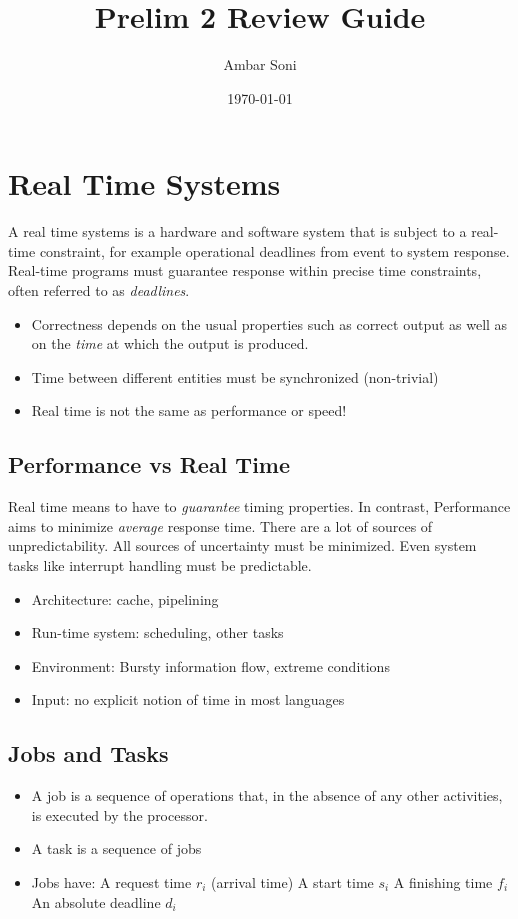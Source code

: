 \documentclass{hw}
\title{Prelim 2 Review Guide}     %
\author{Ambar Soni}               %
\date{\today}                     %
\begin{document}
\maketitle
\tableofcontents

\section{Real Time Systems}
A real time systems is a hardware and software system that is subject to a 
real-time constraint, for example operational deadlines from event to system 
response. Real-time programs must guarantee response within precise time 
constraints, often referred to as \emph{deadlines}.
\begin{itemize}
  \item Correctness depends on  the usual properties such as correct output as
    well as on the \emph{time} at which the output is produced. 
  \item Time between different entities must be synchronized (non-trivial)
  \item Real time is not the same as performance or speed!
\end{itemize}

\subsection{Performance vs Real Time}
Real time means to have to \emph{guarantee} timing properties. In contrast, 
Performance aims to minimize \emph{average} response time. There are a lot
of sources of unpredictability. All sources of uncertainty must be minimized. 
Even system tasks like interrupt handling must be predictable. 
\begin{itemize}
  \item Architecture: cache, pipelining
  \item Run-time system: scheduling, other tasks
  \item Environment: Bursty information flow, extreme conditions
  \item Input: no explicit notion of time in most languages
\end{itemize}

\subsection{Jobs and Tasks}
\begin{itemize}
  \item A job is a sequence of operations that, in the absence of any other
    activities, is executed by the processor.
  \item A task is a sequence of jobs
  \item Jobs have:
    \subitem A request time $r_{i}$ (arrival time)
    \subitem A start time $s_{i}$
    \subitem A finishing time $f_{i}$
    \subitem An absolute deadline $d_{i}$
\end{itemize}
\end{document}
